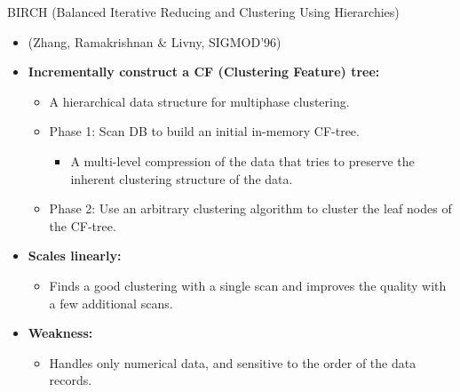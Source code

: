 \begin{frame}{BIRCH (Balanced Iterative Reducing and Clustering Using
		Hierarchies)}
	\begin{itemize}
		\item (Zhang, Ramakrishnan \& Livny, SIGMOD'96)
		\item \textbf{Incrementally construct a CF (Clustering Feature) tree:}
		      \begin{itemize}
			      \item A hierarchical data structure for multiphase clustering.
			      \item Phase 1: Scan DB to build an initial in-memory CF-tree.
			            \begin{itemize}
				            \item A multi-level compression of the data that tries to
				                  preserve the inherent clustering structure of the data.
			            \end{itemize}
			      \item Phase 2: Use an arbitrary clustering algorithm to cluster the
			            leaf nodes of the CF-tree.
		      \end{itemize}
		\item \textbf{Scales linearly:}
		      \begin{itemize}
			      \item Finds a good clustering with a single scan and improves the
			            quality with a few additional scans.
		      \end{itemize}
		\item \textbf{Weakness:}
		      \begin{itemize}
			      \item Handles only numerical data, and sensitive to the order of
			            the data records.
		      \end{itemize}
	\end{itemize}
\end{frame}

